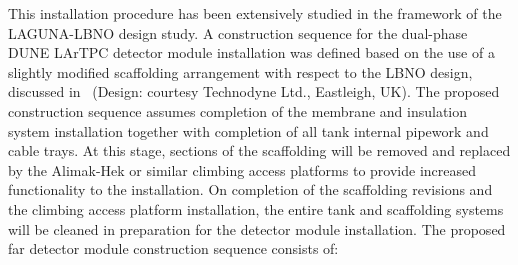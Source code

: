 This installation procedure has been extensively studied in the
framework of the LAGUNA-LBNO design study. A construction sequence for
the dual-phase DUNE LArTPC detector module installation was defined based on
the use of a slightly modified scaffolding arrangement with respect to
the LBNO design, discussed in~\cite{cdr-annex-lbno-2} (Design: courtesy Technodyne
Ltd., Eastleigh, UK). The proposed construction sequence assumes
completion of the membrane and insulation system installation together
with completion of all tank internal pipework and cable trays.  At
this stage, sections of the scaffolding will be removed and replaced
by the Alimak-Hek or similar climbing access platforms to provide
increased functionality to the installation.  On completion of the
scaffolding revisions and the climbing access platform installation,
the entire tank and scaffolding systems will be cleaned in preparation
for the detector module installation. The proposed far detector module construction
sequence consists of:
